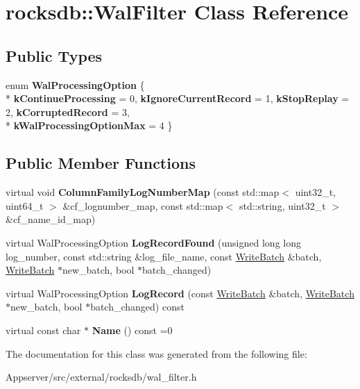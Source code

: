\hypertarget{classrocksdb_1_1WalFilter}{}\section{rocksdb\+:\+:Wal\+Filter Class Reference}
\label{classrocksdb_1_1WalFilter}
\subsection*{Public Types}
\begin{DoxyCompactItemize}
\item 
enum {\bfseries Wal\+Processing\+Option} \{ \\*
{\bfseries k\+Continue\+Processing} = 0, 
{\bfseries k\+Ignore\+Current\+Record} = 1, 
{\bfseries k\+Stop\+Replay} = 2, 
{\bfseries k\+Corrupted\+Record} = 3, 
\\*
{\bfseries k\+Wal\+Processing\+Option\+Max} = 4
 \}\hypertarget{classrocksdb_1_1WalFilter_a5180efe80fd41848c060dda07e5447e5}{}\label{classrocksdb_1_1WalFilter_a5180efe80fd41848c060dda07e5447e5}

\end{DoxyCompactItemize}
\subsection*{Public Member Functions}
\begin{DoxyCompactItemize}
\item 
virtual void {\bfseries Column\+Family\+Log\+Number\+Map} (const std\+::map$<$ uint32\+\_\+t, uint64\+\_\+t $>$ \&cf\+\_\+lognumber\+\_\+map, const std\+::map$<$ std\+::string, uint32\+\_\+t $>$ \&cf\+\_\+name\+\_\+id\+\_\+map)\hypertarget{classrocksdb_1_1WalFilter_ae0d77fb9dc6ae57ed3882578dd4242b7}{}\label{classrocksdb_1_1WalFilter_ae0d77fb9dc6ae57ed3882578dd4242b7}

\item 
virtual Wal\+Processing\+Option {\bfseries Log\+Record\+Found} (unsigned long long log\+\_\+number, const std\+::string \&log\+\_\+file\+\_\+name, const \hyperlink{classrocksdb_1_1WriteBatch}{Write\+Batch} \&batch, \hyperlink{classrocksdb_1_1WriteBatch}{Write\+Batch} $\ast$new\+\_\+batch, bool $\ast$batch\+\_\+changed)\hypertarget{classrocksdb_1_1WalFilter_aa5c25f95586086b2c531fa6b1b565153}{}\label{classrocksdb_1_1WalFilter_aa5c25f95586086b2c531fa6b1b565153}

\item 
virtual Wal\+Processing\+Option {\bfseries Log\+Record} (const \hyperlink{classrocksdb_1_1WriteBatch}{Write\+Batch} \&batch, \hyperlink{classrocksdb_1_1WriteBatch}{Write\+Batch} $\ast$new\+\_\+batch, bool $\ast$batch\+\_\+changed) const\hypertarget{classrocksdb_1_1WalFilter_a2b4938630bb61f4e9ec684f04be792a9}{}\label{classrocksdb_1_1WalFilter_a2b4938630bb61f4e9ec684f04be792a9}

\item 
virtual const char $\ast$ {\bfseries Name} () const =0\hypertarget{classrocksdb_1_1WalFilter_a4a75da8e43b6b04e173a4001a22bf8d8}{}\label{classrocksdb_1_1WalFilter_a4a75da8e43b6b04e173a4001a22bf8d8}

\end{DoxyCompactItemize}


The documentation for this class was generated from the following file\+:\begin{DoxyCompactItemize}
\item 
Appserver/src/external/rocksdb/wal\+\_\+filter.\+h\end{DoxyCompactItemize}
